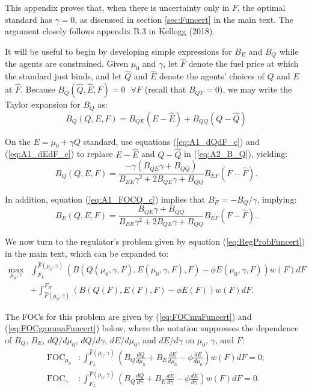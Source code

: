 \documentclass[12pt]{article}
\begin{document}
This appendix proves that, when there is uncertainty only in $F$, the optimal standard has $\gamma=0$, as discussed in section \ref{sec:Funcert} in the main text. The argument closely follows appendix B.3 in Kellogg (2018).

It will be useful to begin by developing simple expressions for $B_E$ and $B_Q$ while the agents are constrained. Given $\mu_0$ and $\gamma$, let $\hat{F}$ denote the fuel price at which the standard just binds, and let $\hat{Q}$ and $\hat{E}$ denote the agents' choices of $Q$ and $E$ at $\hat{F}$. Because $B_Q(\hat{Q},\hat{E},F)=0 \text{ }\forall F$ (recall that $B_{QF}=0$), we may write the Taylor expansion for $B_Q$ as:
\begin{equation}
B_Q(Q,E,F)=B_{QE}(E-\hat{E})+B_{QQ}(Q-\hat{Q}) \label{eq:A2_B_Q}
\end{equation}

On the $E=\mu_0+\gamma Q$ standard, use equations (\ref{eq:A1_dQdF_c}) and (\ref{eq:A1_dEdF_c}) to replace $E-\hat{E}$ and $Q-\hat{Q}$ in (\ref{eq:A2_B_Q}), yielding:
\begin{equation}
B_Q(Q,E,F)=\frac{-\gamma(B_{QE}\gamma+B_{QQ})}{B_{EE}\gamma^2+2B_{QE}\gamma+B_{QQ}}B_{EF}(F-\hat{F}). \label{eq:A2_B_Q_long}
\end{equation}

In addition, equation (\ref{eq:A1_FOCQ_c}) implies that $B_E = -B_Q / \gamma$, implying:
\begin{equation}
B_E(Q,E,F)=\frac{B_{QE}\gamma+B_{QQ}}{B_{EE}\gamma^2+2B_{QE}\gamma+B_{QQ}}B_{EF}(F-\hat{F}). \label{eq:A2_B_E_long}
\end{equation}

We now turn to the regulator's problem given by equation (\ref{eq:RegProbFuncert}) in the main text, which can be expanded to:
\begin{align}
\max_{\mu_0,\gamma} &\int_{F_L}^{\hat{F}(\mu_0,\gamma)}\left(B(Q(\mu_0,\gamma,F),E(\mu_0,\gamma,F),F)-\phi E(\mu_0,\gamma,F)\right)w(F)dF \nonumber \\
&+ \int_{\hat{F}(\mu_0,\gamma)}^{F_H}\left(B(Q(F),E(F),F)-\phi E(F)\right)w(F)dF. \label{eq:A2_RegProbFuncert}
\end{align}

The FOCs for this problem are given by (\ref{eq:FOCmuFuncert}) and (\ref{eq:FOCgammaFuncert}) below, where the notation suppresses the dependence of $B_Q$, $B_E$, $dQ/d\mu_0$, $dQ/d\gamma$, $dE/d\mu_0$, and $dE/d\gamma$ on $\mu_0$, $\gamma$, and $F$:
\begin{align}
\text{FOC}_{\mu_0}&:\int_{F_L}^{\hat{F}(\mu_0,\gamma)}\left(B_Q\frac{dQ}{d\mu_0} +B_E\frac{dE}{d\mu_0} -\phi\frac{dE}{d\mu_0}\right)w(F)dF = 0; \label{eq:FOCmuFuncert} \\
\text{FOC}_{\gamma}&:\int_{F_L}^{\hat{F }(\mu_0,\gamma)}\left(B_Q\frac{dQ}{d\gamma} +B_E\frac{dE}{d\gamma} -\phi\frac{dE}{d\gamma}\right)w(F)dF = 0. \label{eq:FOCgammaFuncert}
\end{align}
\end{document}
